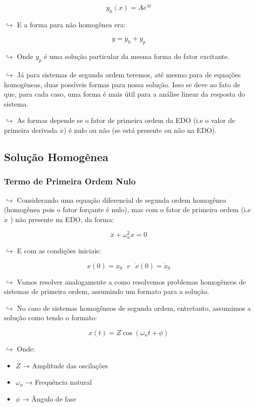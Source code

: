 \documentclass{article}
\begin{document}
\begin{itemize}
\[
y_h(x) = Ae^{\lambda t}
\]

\(\hookrightarrow\) E a forma para não homogênea era:

\[
y = y_h + y_p
\]

\(\hookrightarrow\) Onde \(y_p\) é uma solução particular da mesma forma
do fator excitante.

\(\hookrightarrow\) Já para sistemas de segunda ordem teremos, até mesmo
para de equações homogêneas, duas possíveis formas para nossa solução.
Isso se deve ao fato de que, para cada caso, uma forma é mais útil para
a análise linear da resposta do sistema.

\(\hookrightarrow\) As formas depende se o fator de primeira ordem da
EDO (i.e o valor de primeira derivada \(\dot x\)) é nulo ou não (se está
presente ou não na EDO).

\hypertarget{soluuxe7uxe3o-homoguxeanea-1}{%
\subsection{Solução Homogênea}\label{soluuxe7uxe3o-homoguxeanea-1}}

\hypertarget{termo-de-primeira-ordem-nulo}{%
\subsubsection{Termo de Primeira Ordem
Nulo}\label{termo-de-primeira-ordem-nulo}}

\(\hookrightarrow\) Considerando uma equação diferencial de segunda
ordem homogênea (homogênea pois o fator forçante é nulo), mas com o
fator de primeira ordem (i.e \(\dot x\) ) não presente na EDO, da forma:

\[
\ddot x + \omega^2_nx = 0
\]

\(\hookrightarrow\) E com as condições iniciais:

\[
x(0) = x_0 \ \ \ e \ \ \ \dot x(0) = \dot x_0
\]

\(\hookrightarrow\) Vamos resolver analogamente a como resolvemos
problemas homogêneos de sistemas de primeira ordem, assumindo um formato
para a solução.

\(\hookrightarrow\) No caso de sistemas homogêneos de segunda ordem,
entretanto, assumimos a solução como tendo o formato:

\[
x(t) = Z \cos(\omega_n t + \phi)
\]

\(\hookrightarrow\) Onde:

\begin{itemize}
\tightlist
\item
  \(Z\) → Amplitude das oscilações
\item
  \(\omega_n\) → Frequência natural
\item
  \(\phi\) → Ângulo de fase
\end{itemize}


\end{itemize}
\end{document}
